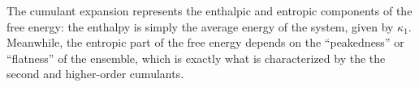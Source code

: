 \documentclass{article}
\begin{document}
The cumulant expansion represents the enthalpic and entropic components of the free energy: the enthalpy is simply the average energy of the system, given by $\kappa_1$. Meanwhile, the entropic part of the free energy depends on the ``peakedness'' or ``flatness'' of the ensemble, which is exactly what is characterized by the the second and higher-order cumulants.






\end{document}

